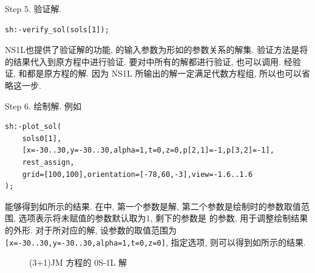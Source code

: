 Step 5. 验证解.
\begin{verbatim}
sh:-verify_sol(sols[1]);
\end{verbatim}
NS1L也提供了验证解的功能, 的输入参数为形如的参数关系的解集. 验证方法是将的结果代入到原方程中进行验证. 要对中所有的解都进行验证, 也可以调用. 经验证, 和都是原方程的解. 因为 NS1L 所输出的解一定满足代数方程组, 所以也可以省略这一步.

Step 6. 绘制解. 例如
\begin{verbatim}
sh:-plot_sol(
    sols0[1],
    [x=-30..30,y=-30..30,alpha=1,t=0,z=0,p[2,1]=-1,p[3,2]=-1],
    rest_assign,
    grid=[100,100],orientation=[-78,60,-3],view=-1.6..1.6
);
\end{verbatim}
能够得到如所示的结果. 在中, 第一个参数是解, 第二个参数是绘制时的参数取值范围, 选项表示将未赋值的参数默认取为1, 剩下的参数是  的参数, 用于调整绘制结果的外形. 对于所对应的解, 设参数的取值范围为 \verb|[x=-30..30,y=-30..30,alpha=1,t=0,z=0]|, 指定选项, 则可以得到如所示的结果.

\begin{figure}[htbp]
\centering
{}
\caption{(3+1)JM 方程的 0S-1L 解}
\end{figure}

